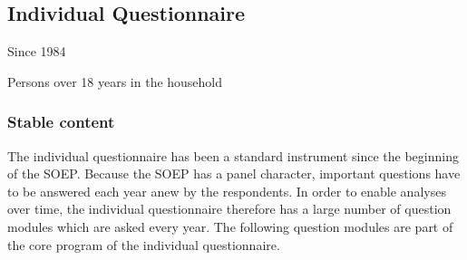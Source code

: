 \documentclass[letterpaper,10pt,openany,onesideH,english]{sphinxmanual}
\begin{document}


\subsection{Individual Questionnaire}
\label{\detokenize{Contents of SOEPcore/index:individual-questionnaire}}\label{\detokenize{Contents of SOEPcore/index:id11}}
 Since 1984

 Persons over 18 years in the household


\subsubsection{Stable content}
\label{\detokenize{Contents of SOEPcore/index:id12}}
The individual questionnaire has been a standard instrument since the beginning of the SOEP. Because the SOEP has a panel character, important questions have to be answered each year anew by the respondents. In order to enable analyses over time, the individual questionnaire therefore has a large number of question modules which are asked every year. The following question modules are part of the core program of the individual questionnaire.
\end{document}
